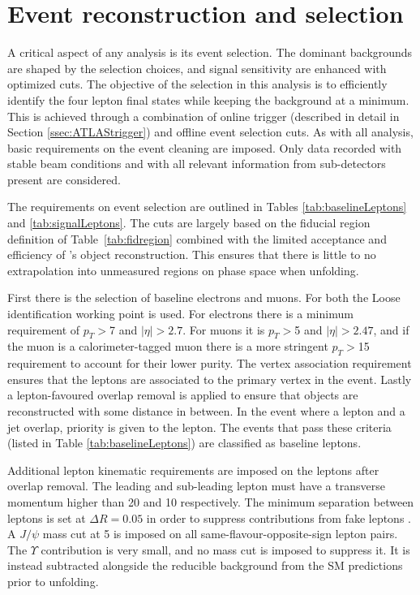 \section{Event reconstruction and selection}
\label{sec:eventselection}
A critical aspect of any analysis is its event selection. The dominant backgrounds are shaped by the selection choices, and signal sensitivity are enhanced with optimized cuts. The objective of the selection in this analysis is to efficiently identify the four lepton final states while keeping the background at a minimum. This is achieved through a combination of online trigger (described in detail in Section \ref{ssec:ATLAStrigger}) and offline event selection cuts. As with all \ATLAS analysis, basic requirements on the event cleaning are imposed. Only data recorded with stable beam conditions and with all relevant information from sub-detectors present are considered. 

The requirements on event selection are outlined in Tables \ref{tab:baselineLeptons} and \ref{tab:signalLeptons}. The cuts are largely based on the fiducial region definition of Table~\ref{tab:fidregion} combined with the limited acceptance and efficiency of \ATLAS's object reconstruction. This ensures that there is little to no extrapolation into unmeasured regions on phase space when unfolding. 

First there is the selection of baseline electrons and muons. For both the Loose identification working point is used. For electrons there is a minimum requirement of $p_T>$\unit{7}{\GeV} and $|\eta|>2.7$. For muons it is $p_T>$\unit{5}{\GeV} and $|\eta|>2.47$, and if the muon is a calorimeter-tagged muon there is a more stringent $p_T>$\unit{15}{\GeV} requirement to account for their lower purity. The vertex association requirement ensures that the leptons are associated to the primary vertex in the event. Lastly a lepton-favoured overlap removal is applied to ensure that objects are reconstructed with some distance in between. In the event where a lepton and a jet overlap, priority is given to the lepton. The events that pass these criteria (listed in Table \ref{tab:baselineLeptons}) are classified as baseline leptons.

Additional lepton kinematic requirements are imposed on the leptons after overlap removal. The leading and sub-leading lepton must have a transverse momentum higher than \unit{20}{\GeV} and \unit{10}{\GeV} respectively. The minimum separation between leptons is set at $\Delta R=0.05$ in order to suppress contributions from fake leptons . A $J/\psi$ mass cut at \unit{5}{\GeV} is imposed on all same-flavour-opposite-sign lepton pairs. The $\Upsilon$ contribution is very small, and no mass cut is imposed to suppress it. It is instead subtracted alongside the reducible background from the SM predictions prior to unfolding.

